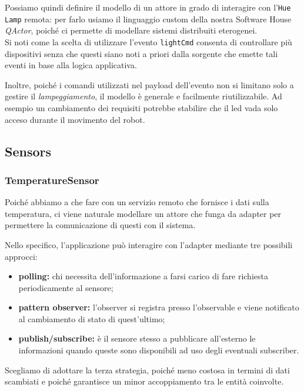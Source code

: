 \documentclass{../llncs}
\newcommand{\codescript}[1]{{\mbox{\small{\texttt{#1}}}}\xspace}
\newcommand{\qa}{\textsf{\textit{QActor}}\xspace}
\begin{document}
Possiamo quindi definire il modello di un attore in grado di interagire con l'\texttt{Hue Lamp} remota: per farlo usiamo il linguaggio custom della nostra Software House \qa, poiché ci permette di modellare sistemi distribuiti eterogenei.\\



Si noti come la scelta di utilizzare l'evento \codescript{lightCmd} consenta di controllare più dispositivi senza che questi siano noti a priori dalla sorgente che emette tali eventi in base alla logica applicativa.

Inoltre, poiché i comandi utilizzati nel payload dell'evento non si limitano solo a gestire il \textit{lampeggiamento}, il modello è generale e facilmente riutilizzabile. Ad esempio un cambiamento dei requisiti potrebbe stabilire che il led vada solo acceso durante il movimento del robot.

\subsection{Sensors}

\subsubsection{TemperatureSensor}
Poiché abbiamo a che fare con un servizio remoto che fornisce i dati sulla temperatura, ci viene naturale modellare un attore che funga da adapter per permettere la comunicazione di questi con il sistema.

Nello specifico, l'applicazione può interagire con l'adapter mediante tre possibili approcci:
\begin{itemize}
\item \textbf{polling:} chi necessita dell'informazione a farsi carico di fare richiesta periodicamente al sensore;
\item \textbf{pattern observer:} l'observer si registra presso l'observable e viene notificato al cambiamento di stato di quest'ultimo;
\item \textbf{publish/subscribe:} è il sensore stesso a pubblicare all'esterno le informazioni quando queste sono disponibili ad uso degli eventuali subscriber.
\end{itemize}
Scegliamo di adottare la terza strategia, poiché meno costosa in termini di dati scambiati e poiché garantisce un minor accoppiamento tra le entità coinvolte.
\end{document}
